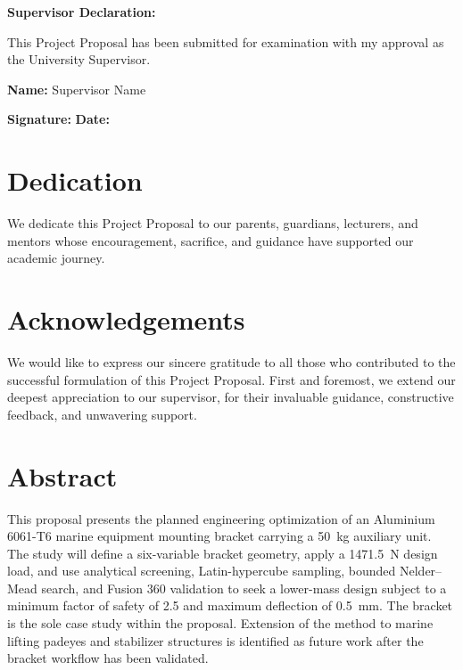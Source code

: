 \documentclass[12pt, a4paper]{report}
\begin{document}
\vspace{1cm}
\noindent
\textbf{Supervisor Declaration:}

\noindent
This Project Proposal has been submitted for examination with my approval as the University Supervisor.

\vspace{1cm}

\noindent
\textbf{Name:} Supervisor Name
\vspace{1cm}

\noindent
\textbf{Signature:} \underline{\hspace{5cm}} \hfill \textbf{Date:} \underline{\hspace{4cm}}

\newpage

\chapter*{Dedication}

We dedicate this Project Proposal to our parents, guardians, lecturers, and mentors whose encouragement, sacrifice, and guidance have supported our academic journey.

\newpage

\chapter*{Acknowledgements}

We would like to express our sincere gratitude to all those who contributed to the successful formulation of this Project Proposal. First and foremost, we extend our deepest appreciation to our supervisor, for their invaluable guidance, constructive feedback, and unwavering support.

\newpage

\chapter*{Abstract}

This proposal presents the planned engineering optimization of an Aluminium 6061-T6 marine equipment mounting bracket carrying a 50~kg auxiliary unit. The study will define a six-variable bracket geometry, apply a 1471.5~N design load, and use analytical screening, Latin-hypercube sampling, bounded Nelder--Mead search, and Fusion 360 validation to seek a lower-mass design subject to a minimum factor of safety of 2.5 and maximum deflection of 0.5~mm. The bracket is the sole case study within the proposal. Extension of the method to marine lifting padeyes and stabilizer structures is identified as future work after the bracket workflow has been validated.
\end{document}
